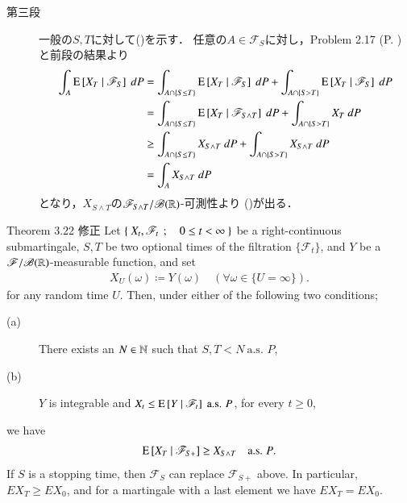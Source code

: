 \begin{prf}
\begin{description}
			\item[第三段]
				一般の$S,T$に対して()を示す．
				任意の$A \in \mathscr{F}_S$に対し，Problem 2.17 (P. \pageref{chapter_1_Problem_2_17})
				と前段の結果より
				\begin{align}
					\int_A \cexp{X_T}{\mathscr{F}_S}\ dP
					&= \int_{A \cap \{S \leq T\}} \cexp{X_T}{\mathscr{F}_S}\ dP
						+ \int_{A \cap \{S > T\}} \cexp{X_T}{\mathscr{F}_S}\ dP \\
					&= \int_{A \cap \{S \leq T\}} \cexp{X_T}{\mathscr{F}_{S \wedge T}}\ dP
						+ \int_{A \cap \{S > T\}} X_T\ dP \\
					&\geq \int_{A \cap \{S \leq T\}} X_{S \wedge T}\ dP
					 	+ \int_{A \cap \{S > T\}} X_{S \wedge T}\ dP \\
					&= \int_A X_{S \wedge T}\ dP
				\end{align}
				となり，$X_{S \wedge T}$の$\mathscr{F}_{S \wedge T}/\mathscr{B}(\mathbb{R})$-可測性より
				()が出る．
				\QED
		\end{description}
	\end{prf}
	
	\begin{itembox}[l]{Theorem 3.22 修正}
		Let $\left\{\ X_t,\mathscr{F}_t\ \, ; \quad 0 \leq t < \infty\ \right\}$ be a right-continuous submartingale,
		$S, T$ be two optional times of the filtration $\{\mathscr{F}_t\}$,
		and $Y$ be a $\mathscr{F}/\mathscr{B}(\mathbb{R})$-measurable function, and set
		\begin{align}
			X_U(\omega) \coloneqq Y(\omega)
			\quad (\forall \omega \in \{U = \infty\}).
		\end{align}
		for any random time $U$. Then, under either of the following two conditions;
		\begin{description}
			\item[(a)] There exists an $N \in \mathbb{N}$ such that $S,T < N\ \mbox{a.s. $P$}$,
			\item[(b)] $Y$ is integrable and $X_t \leq \operatorname{E} \left[ Y \ \middle|\ \mathscr{F}_t \right]\ \mbox{a.s. $P$}$, for every $t \geq 0$,
		\end{description}
		we have
		\begin{align}
			\operatorname{E} \left[ X_T \ \middle|\ \mathscr{F}_{S+} \right] \geq X_{S \wedge T}
			\quad \mbox{a.s. $P$}.
		\end{align}
		If $S$ is a stopping time, then $\mathscr{F}_S$ can replace $\mathscr{F}_{S+}$ above.
		In particular, $EX_T \geq EX_0$, and for a martingale with a last element we have $EX_T = EX_0$.
	\end{itembox}
	
